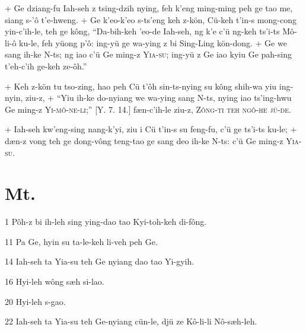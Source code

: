 +	Ge dziang-fu Iah-seh z tsing-dzih nying, feh k'eng ming-ming peh ge tao me, siang s-'ô t'e-hweng.
+	Ge k'eo-k'eo s-ts'eng keh z-kön, Cü-keh t'in-s mong-cong yin-c'ih-le, teh ge kông, ``Da-bih-keh 'eo-de Iah-seh, ng k'e c'ü ng-keh ts'i-ts Mô-li-ô ku-le, feh yüong p'ô: ing-yü ge wa-ying z bi Sing-Ling kön-dong.
+	Ge we sang ih-ke N-ts; ng iao c'ü Ge ming-z \textsc{Yia-su}; ing-yü z Ge iao kyiu Ge pah-sing t'eh-c'ih ge-keh ze-ôh.''
\par
+	Keh z-kön tu tso-zing, hao peh Cü t'ôh sin-ts-nying su kông shih-wa yiu ing-nyin, ziu-z,
+	``Yiu ih-ke do-nyiang we wa-ying sang N-ts, nying iao ts'ing-hwu Ge ming-z \textsc{Yi-mô-ne-li};'' [Y. 7. 14.] fæn-c'ih-le ziu-z, \textsc{Zông-ti teh ngô-he jü-de}.
\par
+	Iah-seh kw'eng-sing nang-k'yi, ziu i Cü t'in-s su feng-fu, c'ü ge ts'i-ts ku-le;
+	dæn-z vong teh ge dong-vông teng-tao ge sang deo ih-ke N-ts: c'ü Ge ming-z \textsc{Yia-su}.



\section{Mt.}%

\begin{sAbstract}
	\item[1] Pôh-z bi ih-leh sing ying-dao tao Kyi-toh-keh di-fông.
	\item[11] Pa Ge, hyin su ta-le-keh li-veh peh Ge.
	\item[14] Iah-seh ta Yia-su teh Ge nyiang dao tao Yi-gyih.
	\item[16] Hyi-leh wông sæh si-lao.
	\item[20] Hyi-leh s-gao.
	\item[22] Iah-seh ta Yia-su teh Ge-nyiang cün-le, djü ze Kô-li-li Nô-sæh-leh.
\end{sAbstract}

